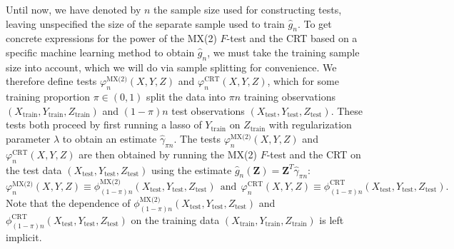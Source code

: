 \documentclass[12pt]{article}
\theoremstyle{definition}
\theoremstyle{remark}
\newcommand{\srx}{X}
\newcommand{\prz}{\bm Z}
\newcommand{\srz}{Z}
\newcommand{\sry}{Y}
\begin{document}
Until now, we have denoted by $n$ the sample size used for constructing tests, leaving unspecified the size of the separate sample used to train $\widehat g_n$. To get concrete expressions for the power of the MX(2) $F$-test and the CRT based on a specific machine learning method to obtain $\widehat g_n$, we must take the training sample size into account, which we will do via sample splitting for convenience. We therefore define tests $\varphi_n^{\text{MX(2)}}(\srx, \sry, \srz)$ and $\varphi_n^{\text{CRT}}(\srx, \sry, \srz)$, which for some training proportion $\pi \in (0,1)$ split the data into $\pi n$ training observations $(\srx_{\text{train}}, \sry_{\text{train}}, \srz_{\text{train}})$ and $(1-\pi)n$ test observations $(\srx_{\text{test}}, \sry_{\text{test}}, \srz_{\text{test}})$. These tests both proceed by first running a lasso of $\sry_{\text{train}}$ on $\srz_{\text{train}}$ with regularization parameter $\lambda$ to obtain an estimate $\widehat \gamma_{\pi n}$. The tests $\varphi_n^{\text{MX(2)}}(\srx, \sry, \srz)$ and $\varphi_n^{\text{CRT}}(\srx, \sry, \srz)$ are then obtained by running the MX(2) $F$-test and the CRT on the test data $(\srx_{\text{test}}, \sry_{\text{test}}, \srz_{\text{test}})$ using the estimate $\widehat g_n(\prz) = \prz^T \widehat \gamma_{\pi n}$:
\begin{equation*}
	\varphi_n^{\text{MX(2)}}(\srx, \sry, \srz) \equiv \phi_{(1-\pi)n}^{\text{MX(2)}}(\srx_{\text{test}}, \sry_{\text{test}}, \srz_{\text{test}}) \ \ \text{and} \ \ \varphi_n^{\text{CRT}}(\srx, \sry, \srz) \equiv \phi_{(1-\pi)n}^{\text{CRT}}(\srx_{\text{test}}, \sry_{\text{test}}, \srz_{\text{test}}).
\end{equation*}
Note that the dependence of $\phi_{(1-\pi)n}^{\text{MX(2)}}(\srx_{\text{test}}, \sry_{\text{test}}, \srz_{\text{test}})$ and $\phi_{(1-\pi)n}^{\text{CRT}}(\srx_{\text{test}}, \sry_{\text{test}}, \srz_{\text{test}})$ on the training data $(\srx_{\text{train}}, \sry_{\text{train}}, \srz_{\text{train}})$ is left implicit. 
\end{document}
